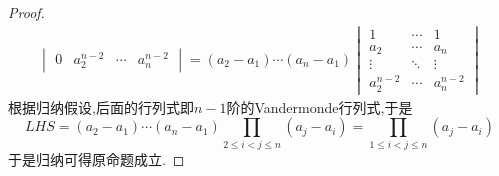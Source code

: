 \documentclass{ctexart}
\begin{document}
\begin{proof}
\[\begin{aligned}
\begin{vmatrix}
            0&a_2^{n-2}&\cdots&a_n^{n-2}
        \end{vmatrix}=\left(a_2-a_1\right)\cdots\left(a_n-a_1\right)\begin{vmatrix}
            1&\cdots&1\\
            a_2&\cdots&a_n\\
            \vdots&\ddots&\vdots\\
            a_2^{n-2}&\cdots&a_n^{n-2}
        \end{vmatrix}
    \end{aligned}\]
    根据归纳假设,后面的行列式即$n-1$阶的Vandermonde行列式,于是
    \[LHS=\left(a_2-a_1\right)\cdots\left(a_n-a_1\right)\prod_{2\leqslant i<j\leqslant n}\left(a_j-a_i\right)=\prod_{1\leqslant i<j\leqslant n}\left(a_j-a_i\right)\]
    于是归纳可得原命题成立.
\end{proof}
\end{document}
